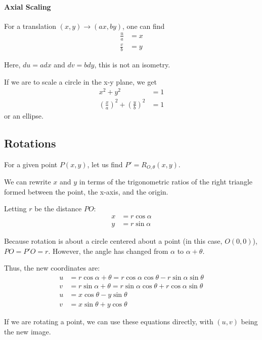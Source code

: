 \documentclass{article}
\begin{document}
\paragraph{Axial Scaling}
For a translation $(x, y) \longrightarrow (ax, by)$, one can find
\begin{align*}
    \frac{u}{a} & = x  \\
    \frac{v}{b} & = y
\end{align*}

Here, $du = adx$ and $dv = bdy$, this is not an isometry.

If we are to scale a circle in the x-y plane, we get
\begin{align*}
    x^2+y^2 & = 1 \\
    \left( \frac{x}{a} \right)^2 + \left( \frac{y}{b} \right)^2 & = 1
\end{align*}
or an ellipse.

\subsection{Rotations}
For a given point $P(x,y)$, let us find $P' = R_{O, \theta}(x,y)$.

We can rewrite $x$ and $y$ in terms of the trigonometric ratios of the right triangle formed between the point, the x-axis, and the origin.

Letting $r$ be the distance $PO$:
\begin{align*}
    x &= r \cos{\alpha} \\ 
    y &= r \sin{\alpha}
\end{align*}

Because rotation is about a circle centered about a point (in this case, $O(0,0)$), $PO = P'O = r$.
However, the angle has changed from $\alpha$ to $\alpha + \theta$.

Thus, the new coordinates are:
\begin{align*}
    u &= r \cos{\alpha + \theta} = r \cos{\alpha}\cos{\theta} - r \sin{\alpha}\sin{\theta} \\ 
    v &= r \sin{\alpha + \theta} = r \sin{\alpha}\cos{\theta} + r \cos{\alpha}\sin{\theta} \\
    u &= x \cos{\theta} - y \sin{\theta} \\
    v &= x \sin{\theta} + y \cos{\theta}
\end{align*}

If we are rotating a point, we can use these equations directly, with $(u,v)$ being the new image.
\end{document}
